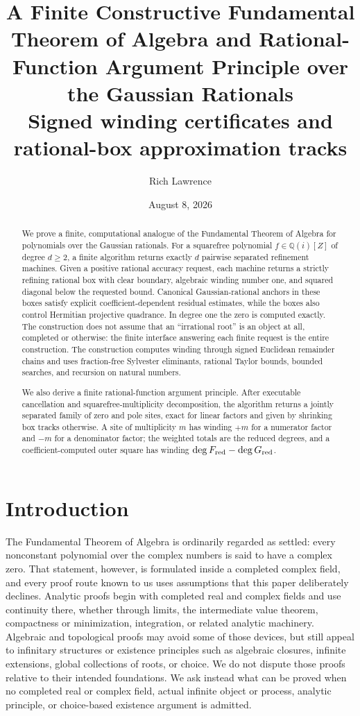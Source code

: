 \documentclass[11pt]{article}
\title{A Finite Constructive Fundamental Theorem of Algebra and Rational-Function Argument Principle over the Gaussian Rationals\\
\large Signed winding certificates and rational-box approximation tracks}
\author{Rich Lawrence}
\date{August 8, 2026}
\newcommand{\Qi}{\mathbb{Q}(i)}
\begin{document}
\maketitle

\begin{abstract}
We prove a finite, computational analogue of the Fundamental Theorem of
Algebra for polynomials over the Gaussian rationals.  For a squarefree
polynomial $f\in\Qi[Z]$ of degree $d\ge2$, a finite algorithm returns exactly
$d$ pairwise separated refinement machines.  Given a positive rational
accuracy request, each machine returns a strictly refining rational box with
clear boundary, algebraic winding number one, and squared diagonal below the
requested bound.  Canonical Gaussian-rational anchors in these boxes satisfy
explicit coefficient-dependent residual estimates, while the boxes also
control Hermitian projective quadrance.  In degree one the zero is computed
exactly.
The construction does not assume that an ``irrational root'' is an
object at all, completed or otherwise: the finite interface answering each
finite request is the entire construction.  The construction computes winding
through signed Euclidean remainder chains and uses fraction-free Sylvester
eliminants, rational Taylor bounds, bounded searches, and recursion on natural
numbers.

We also derive a finite rational-function argument principle.  After
executable cancellation and squarefree-multiplicity decomposition, the
algorithm returns a jointly separated family of zero and pole sites, exact
for linear factors and given by shrinking box tracks otherwise.  A site of
multiplicity $m$ has winding $+m$ for a numerator factor and $-m$ for a
denominator factor; the weighted totals are the reduced degrees, and a
coefficient-computed outer square has winding
$\deg F_{\rm red}-\deg G_{\rm red}$.
\end{abstract}

\tableofcontents

\section{Introduction}

The Fundamental Theorem of Algebra is ordinarily regarded as settled: every
nonconstant polynomial over the complex numbers is said to have a complex
zero.  That statement, however, is formulated inside a completed complex
field, and every proof route known to us uses assumptions that this paper
deliberately declines.  Analytic proofs begin with completed real and complex
fields and use continuity there, whether through limits, the intermediate
value theorem, compactness or minimization, integration, or related analytic
machinery.  Algebraic and topological proofs may avoid some of those devices,
but still appeal to infinitary structures or existence principles such as
algebraic closures, infinite extensions, global collections of roots, or
choice.  We do not dispute those proofs relative to their intended
foundations.  We ask instead what can be proved when no completed real or
complex field, actual infinite object or process, analytic principle, or
choice-based existence argument is admitted.
\end{document}
